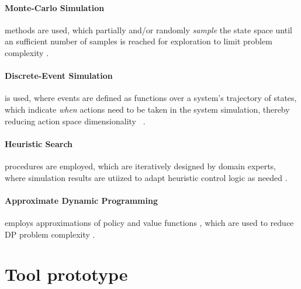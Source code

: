 \documentclass[a4paper,twoside]{article}
\begin{document}
\paragraph{Monte-Carlo Simulation} methods are used, which partially and/or randomly \textit{sample} the state space until an sufficient number of samples is reached for exploration to limit problem complexity \cite{ascher_hackenberg_2015}. 
\paragraph{Discrete-Event Simulation} is used, where events are defined as functions over a system's trajectory of states, which indicate \textit{when} actions need to be taken in the system simulation, thereby reducing action space dimensionality ~\cite{ascher2023discrete}.
\paragraph{Heuristic Search} procedures are employed, which are iteratively designed by domain experts, where simulation results are utiized to adapt heuristic control logic as needed \cite{ascher_hackenberg_2015}.
\paragraph{Approximate Dynamic Programming} employs approximations of policy and value functions \cite{powell_approximate_2007}, which are used to reduce DP problem complexity \cite{ascher_hackenberg_albayrak_2023}.

	
	\section{Tool prototype}
	\label{sec:tool-prototype}
	
\end{document}
